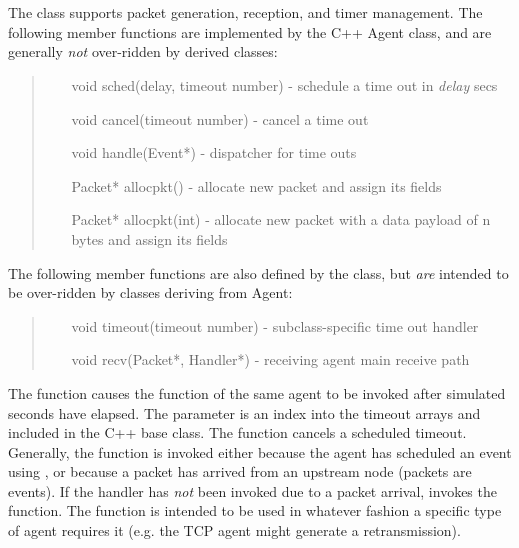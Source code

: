 \section{}

The  class supports packet generation, reception,
and timer management.
The following member functions are implemented by the C++ Agent class, and are
generally {\em not} over-ridden by derived classes:
\begin{tt}
\begin{quote}
\begin{itemize}
\item[void sched(delay, timeout number)] - schedule a time out in {\em delay} secs
\item[void cancel(timeout number)] - cancel a time out
\item[void handle(Event*)] - dispatcher for time outs
\item[Packet* allocpkt()] - allocate new packet and assign its fields
\item[Packet* allocpkt(int)] - allocate new packet with a data payload of n bytes and assign its fields
\end{itemize}
\end{quote}
\end{tt}
The following member functions are also defined by the  class,
but {\em are} intended to be over-ridden by classes deriving from Agent:
\begin{tt}
\begin{quote}
\begin{itemize}
        \item[void timeout(timeout number)] - subclass-specific time out handler
        \item[void recv(Packet*, Handler*)] - receiving agent main receive path
\end{itemize}
\end{quote}
\end{tt}
The  function causes the  function
of the same agent to be invoked after  simulated
seconds have elapsed.
The  parameter is an index into the
timeout arrays  and  included in the
C++  base class.
The  function cancels a scheduled timeout.
Generally, the  function is invoked either
because the agent has scheduled an event using , or
because a packet has arrived from an upstream node (packets are events).
If the handler has \emph{not} been invoked due to a packet arrival,
 invokes the  function.
The  function is intended to be used in whatever fashion
a specific type of agent requires it
(e.g. the TCP agent might generate a retransmission).

